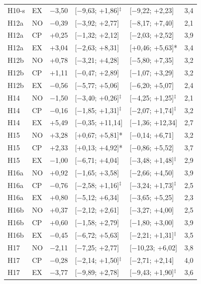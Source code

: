 \begin{table}[H]
\begin{tabular}{@{}llrllr@{}}
H10-s & EX & $-$3{,}50 & [$-$9{,}63; +1{,}86]$^\ddagger$ & [$-$9{,}22; +2{,}23] & 3{,}4 \\
H12a & NO & $-$0{,}39 & [$-$3{,}92; +2{,}77] & [$-$8{,}17; +7{,}40] & 2{,}1 \\
H12a & CP & +0{,}25 & [$-$1{,}32; +2{,}12] & [$-$2{,}03; +2{,}52] & 3{,}9 \\
H12a & EX & +3{,}04 & [$-$2{,}63; +8{,}31] & [+0{,}46; +5{,}63]* & 3{,}4 \\
H12b & NO & +0{,}78 & [$-$3{,}21; +4{,}28] & [$-$5{,}80; +7{,}35] & 3{,}2 \\
H12b & CP & +1{,}11 & [$-$0{,}47; +2{,}89] & [$-$1{,}07; +3{,}29] & 3{,}2 \\
H12b & EX & $-$0{,}56 & [$-$5{,}77; +5{,}06] & [$-$6{,}20; +5{,}07] & 2{,}4 \\
H14 & NO & $-$1{,}50 & [$-$3{,}40; +0{,}26]$^\ddagger$ & [$-$4{,}25; +1{,}25]$^\ddagger$ & 2{,}1 \\
H14 & CP & $-$0{,}16 & [$-$1{,}85; +1{,}31]$^\ddagger$ & [$-$2{,}07; +1{,}74]$^\ddagger$ & 3{,}2 \\
H14 & EX & +5{,}49 & [$-$0{,}35; +11{,}14] & [$-$1{,}36; +12{,}34] & 2{,}7 \\
H15 & NO & +3{,}28 & [+0{,}67; +5{,}81]* & [$-$0{,}14; +6{,}71] & 3{,}2 \\
H15 & CP & +2{,}33 & [+0{,}13; +4{,}92]* & [$-$0{,}86; +5{,}52] & 3{,}7 \\
H15 & EX & $-$1{,}00 & [$-$6{,}71; +4{,}04] & [$-$3{,}48; +1{,}48]$^\ddagger$ & 2{,}9 \\
H16a & NO & +0{,}92 & [$-$1{,}65; +3{,}58] & [$-$2{,}66; +4{,}50] & 3{,}9 \\
H16a & CP & $-$0{,}76 & [$-$2{,}58; +1{,}16]$^\ddagger$ & [$-$3{,}24; +1{,}73]$^\ddagger$ & 2{,}5 \\
H16a & EX & +0{,}80 & [$-$5{,}12; +6{,}34] & [$-$3{,}65; +5{,}25] & 2{,}3 \\
H16b & NO & +0{,}37 & [$-$2{,}12; +2{,}61] & [$-$3{,}27; +4{,}00] & 2{,}5 \\
H16b & CP & +0{,}60 & [$-$1{,}58; +2{,}79] & [$-$1{,}80; +3{,}00] & 3{,}9 \\
H16b & EX & $-$0{,}45 & [$-$6{,}72; +5{,}63] & [$-$2{,}21; +1{,}31]$^\ddagger$ & 3{,}5 \\
H17 & NO & $-$2{,}11 & [$-$7{,}25; +2{,}77] & [$-$10{,}23; +6{,}02] & 3{,}8 \\
H17 & CP & $-$0{,}28 & [$-$2{,}14; +1{,}50]$^\ddagger$ & [$-$2{,}71; +2{,}14] & 4{,}0 \\
H17 & EX & $-$3{,}77 & [$-$9{,}89; +2{,}78] & [$-$9{,}43; +1{,}90]$^\ddagger$ & 3{,}6 \\

\end{tabular}
\end{table}
